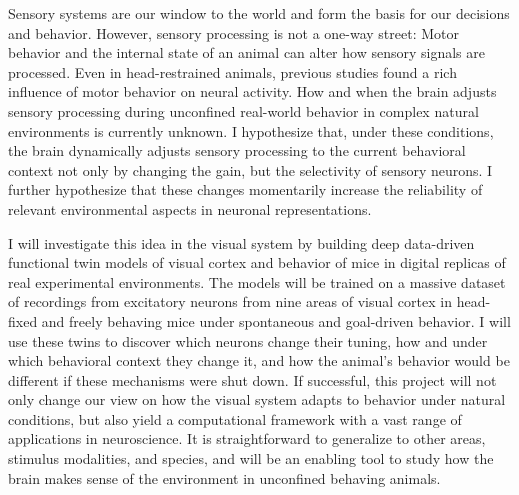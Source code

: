 Sensory systems are our window to the world and form the basis for our decisions and behavior. 
However, sensory processing is not a one-way street:
Motor behavior and the internal state of an animal can alter how sensory signals are processed.
Even in head-restrained animals, previous studies found a rich influence of motor behavior on neural activity. 
How and when the brain adjusts sensory processing during unconfined real-world  behavior in complex natural environments is currently unknown. 
I hypothesize that, under these conditions, the brain dynamically adjusts sensory processing to the current behavioral context not only by changing the gain, but the selectivity of sensory neurons. 
I further hypothesize that these changes momentarily increase the reliability of relevant environmental aspects in neuronal representations. 

I will investigate this idea in the visual system by building deep data-driven functional twin models of visual cortex and behavior of mice in digital replicas of real experimental environments.
The models will be trained on a massive dataset of recordings from excitatory neurons from nine areas of visual cortex in head-fixed and freely behaving mice under spontaneous and goal-driven behavior.
I will use these twins to discover which neurons change their tuning, how and under which behavioral context they change it, and how the animal's behavior would be different if these mechanisms were shut down.
If successful, this project will not only change our view on how the visual system adapts to behavior under natural conditions, but also yield a computational framework with a vast range of applications in neuroscience. 
It is straightforward to generalize to other areas, stimulus modalities, and species, and will be an enabling tool to study how the brain makes sense of the environment in unconfined behaving animals.


